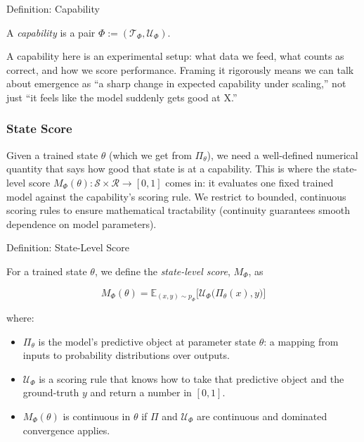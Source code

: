 \documentclass[12pt]{article}
\begin{document}
\begin{statementbox}{Definition: Capability}

A \textit{capability} is a pair $\Phi:=(\mathcal T_\Phi, \mathcal U _\Phi)$.

\end{statementbox}

A capability here is an experimental setup: what data we feed, what counts as correct, and how we score performance. Framing it rigorously means we can talk about emergence as “a sharp change in expected capability under scaling,” not just “it feels like the model suddenly gets good at X.”

\subsubsection{State Score}

Given a trained state $\theta$ (which we get from $\Pi_\theta$), we need a well-defined numerical quantity that says how good that state is at a capability. This is where the state-level score $M_\Phi(\theta):\mathcal S \times \mathcal R \to [0,1]$ comes in: it evaluates one fixed trained model against the capability’s scoring rule. We restrict to bounded, continuous scoring rules to ensure mathematical tractability (continuity guarantees smooth dependence on model parameters).

\begin{statementbox}{Definition: State-Level Score}

For a trained state $\theta$, we define the \textit{state-level score}, $M_\Phi$, as 

\[
M_\Phi(\theta)=\mathbb E_{(x,y)\sim p_\Phi}\Big[\mathcal U_\Phi\big(\Pi_\theta(x),y\big)\Big]
\]

where:
\begin{itemize}
    \item $\Pi_\theta$ is the model’s predictive object at parameter state $\theta$: a mapping from inputs to probability distributions over outputs.
    \item $\mathcal U_\Phi$ is a scoring rule that knows how to take that predictive object and the ground-truth $y$ and return a number in $[0,1]$.
    \item $M_\Phi(\theta)$ is continuous in $\theta$ if $\Pi$ and $\mathcal U _\Phi$ are continuous and dominated convergence applies.
\end{itemize}

\end{statementbox}
\end{document}
